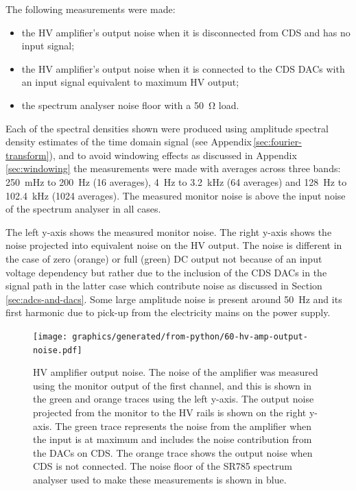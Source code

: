 The following measurements were made:
\begin{itemize}
  \item the \gls{HV} amplifier's output noise when it is disconnected from \gls{CDS} and has no input signal;
  \item the \gls{HV} amplifier's output noise when it is connected to the \gls{CDS} \glspl{DAC} with an input signal equivalent to maximum \gls{HV} output;
  \item the spectrum analyser noise floor with a \SI{50}{\ohm} load.
\end{itemize}
Each of the spectral densities shown were produced using amplitude spectral density estimates of the time domain signal (see Appendix\,\ref{sec:fourier-transform}), and to avoid windowing effects as discussed in Appendix\,\ref{sec:windowing} the measurements were made with averages across three bands: \SI{250}{\milli\hertz} to \SI{200}{\hertz} (\num{16} averages), \SI{4}{\hertz} to \SI{3.2}{\kilo\hertz} (\num{64} averages) and \SI{128}{\hertz} to \SI{102.4}{\kilo\hertz} (\num{1024} averages). The measured monitor noise is above the input noise of the spectrum analyser in all cases.

The left y-axis shows the measured monitor noise. The right y-axis shows the noise projected into equivalent noise on the \gls{HV} output. The noise is different in the case of zero (orange) or full (green) \gls{DC} output not because of an input voltage dependency but rather due to the inclusion of the \gls{CDS} \glspl{DAC} in the signal path in the latter case which contribute noise as discussed in Section\,\ref{sec:adcs-and-dacs}. Some large amplitude noise is present around \SI{50}{\hertz} and its first harmonic due to pick-up from the electricity mains on the power supply.

\begin{figure}
  \centering
  \texttt{[image: graphics/generated/from-python/60-hv-amp-output-noise.pdf]}
  \caption[High voltage amplifier output noise]{\gls{HV} amplifier output noise. The noise of the amplifier was measured using the monitor output of the first channel, and this is shown in the green and orange traces using the left y-axis. The output noise projected from the monitor to the \gls{HV} rails is shown on the right y-axis. The green trace represents the noise from the amplifier when the input is at maximum and includes the noise contribution from the \glspl{DAC} on \gls{CDS}. The orange trace shows the output noise when \gls{CDS} is not connected. The noise floor of the SR785 spectrum analyser used to make these measurements is shown in blue.}
  \label{fig:hv-amp-output-noise}
\end{figure}

